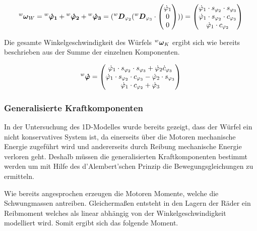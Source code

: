 \begin{equation}
\prescript{w}{}{}\boldsymbol{\omega}_W = \prescript{w}{}{}\boldsymbol{\dot{\varphi}_1} + \prescript{w}{}{}\boldsymbol{\dot{\varphi}_2} + \prescript{w}{}{}\boldsymbol{\dot{\varphi}_3} = 
(\prescript{w}{}{}\boldsymbol{D}_{\varphi_2} (
\prescript{w}{}{}\boldsymbol{D}_{\varphi_3} \cdot \begin{pmatrix}
\dot{\varphi}_1 \\ 0 \\ 0
\end{pmatrix} ) )
=
\begin{pmatrix}
\dot{\varphi}_1 \cdot s_{\varphi_2} \cdot s_{\varphi_3} \\
\dot{\varphi}_1 \cdot s_{\varphi_2} \cdot c_{\varphi_3} \\
\dot{\varphi}_1 \cdot c_{\varphi_2}
\end{pmatrix}
\end{equation}

Die gesamte Winkelgeschwindigkeit des Würfels $\prescript{w}{}{}\boldsymbol{\omega}_K$ ergibt sich wie bereits beschrieben aus der Summe der einzelnen Komponenten.

\begin{equation}
\prescript{w}{}{}\boldsymbol{\dot{\varphi}} = 
\begin{pmatrix}
\dot{\varphi}_1 \cdot s_{\varphi_2} \cdot s_{\varphi_3} + \dot{\varphi}_2 \dot c_{\varphi_3} \\
\dot{\varphi}_1 \cdot s_{\varphi_2} \cdot c_{\varphi_3} - \dot{\varphi}_2 \cdot s_{\varphi_3} \\
\dot{\varphi}_1 \cdot c_{\varphi_2} + \dot{\varphi}_3
\end{pmatrix}
\end{equation}



\subsubsection{Generalisierte Kraftkomponenten}
In der Untersuchung des 1D-Modelles wurde bereits gezeigt, dass der Würfel ein nicht konservatives System ist, da einerseits über die Motoren mechanische Energie zugeführt wird und andererseits durch Reibung mechanische Energie verloren geht. Deshalb müssen die generalisierten Kraftkomponenten bestimmt werden um mit Hilfe des d'Alembert'schen Prinzip die Bewegungsgleichungen zu ermitteln.
\newline

Wie bereits angesprochen erzeugen die Motoren Momente, welche die Schwungmassen antreiben. Gleichermaßen entsteht in den Lagern der Räder ein Reibmoment welches als linear abhängig von der Winkelgeschwindigkeit modelliert wird. Somit ergibt sich das folgende Moment.

